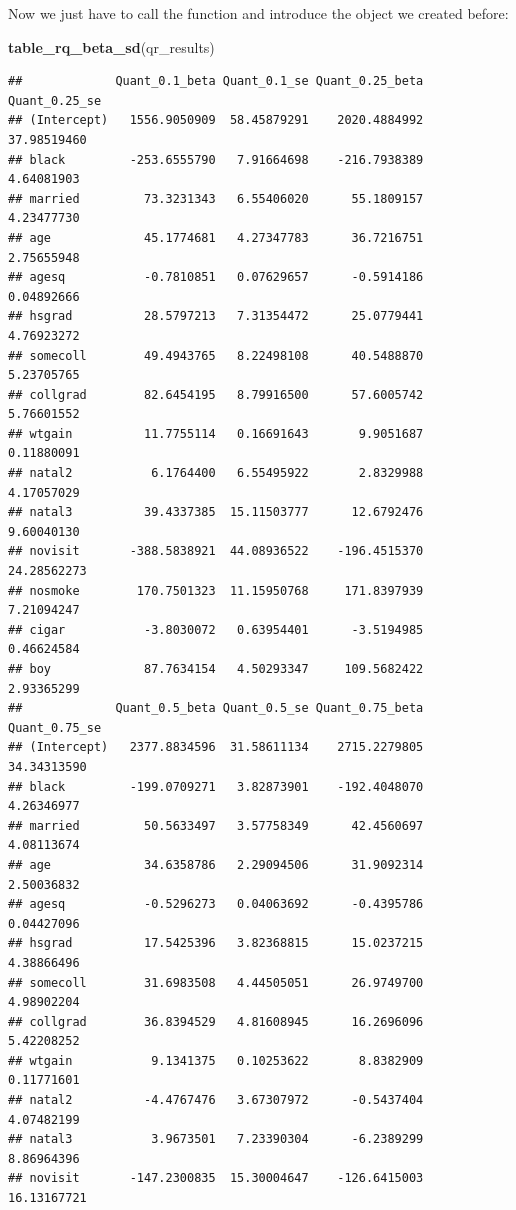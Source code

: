\documentclass[]{book}
\newenvironment{Shaded}{\begin{snugshade}}{\end{snugshade}}
\newcommand{\KeywordTok}[1]{\textcolor[rgb]{0.13,0.29,0.53}{\textbf{#1}}}
\newcommand{\NormalTok}[1]{#1}
\begin{document}
Now we just have to call the function and introduce the object we
created before:

\begin{Shaded}
\begin{Highlighting}[]
\KeywordTok{table_rq_beta_sd}\NormalTok{(qr_results)}
\end{Highlighting}
\end{Shaded}

\begin{verbatim}
##             Quant_0.1_beta Quant_0.1_se Quant_0.25_beta Quant_0.25_se
## (Intercept)   1556.9050909  58.45879291    2020.4884992   37.98519460
## black         -253.6555790   7.91664698    -216.7938389    4.64081903
## married         73.3231343   6.55406020      55.1809157    4.23477730
## age             45.1774681   4.27347783      36.7216751    2.75655948
## agesq           -0.7810851   0.07629657      -0.5914186    0.04892666
## hsgrad          28.5797213   7.31354472      25.0779441    4.76923272
## somecoll        49.4943765   8.22498108      40.5488870    5.23705765
## collgrad        82.6454195   8.79916500      57.6005742    5.76601552
## wtgain          11.7755114   0.16691643       9.9051687    0.11880091
## natal2           6.1764400   6.55495922       2.8329988    4.17057029
## natal3          39.4337385  15.11503777      12.6792476    9.60040130
## novisit       -388.5838921  44.08936522    -196.4515370   24.28562273
## nosmoke        170.7501323  11.15950768     171.8397939    7.21094247
## cigar           -3.8030072   0.63954401      -3.5194985    0.46624584
## boy             87.7634154   4.50293347     109.5682422    2.93365299
##             Quant_0.5_beta Quant_0.5_se Quant_0.75_beta Quant_0.75_se
## (Intercept)   2377.8834596  31.58611134    2715.2279805   34.34313590
## black         -199.0709271   3.82873901    -192.4048070    4.26346977
## married         50.5633497   3.57758349      42.4560697    4.08113674
## age             34.6358786   2.29094506      31.9092314    2.50036832
## agesq           -0.5296273   0.04063692      -0.4395786    0.04427096
## hsgrad          17.5425396   3.82368815      15.0237215    4.38866496
## somecoll        31.6983508   4.44505051      26.9749700    4.98902204
## collgrad        36.8394529   4.81608945      16.2696096    5.42208252
## wtgain           9.1341375   0.10253622       8.8382909    0.11771601
## natal2          -4.4767476   3.67307972      -0.5437404    4.07482199
## natal3           3.9673501   7.23390304      -6.2389299    8.86964396
## novisit       -147.2300835  15.30004647    -126.6415003   16.13167721

\end{verbatim}
\end{document}
